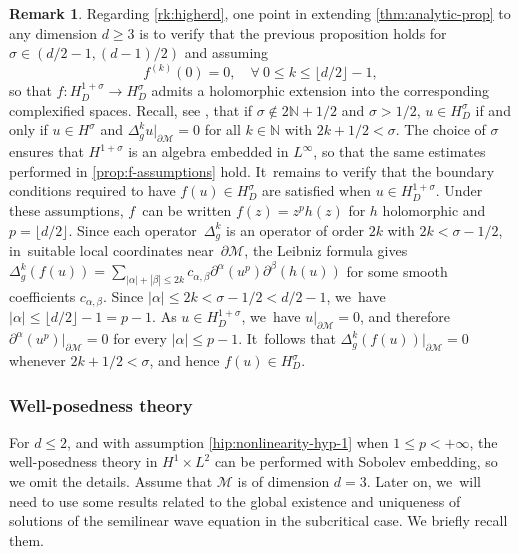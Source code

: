 \documentclass[10pt]{amsart}
\theoremstyle{definition}
\newtheorem{remark}[theorem]{Remark}
\let\mc\mathcal
\let\al\alpha
\newcommand{\M}{\mc{M}}
\newcommand{\N}{\mathbb{N}}
\begin{document}
\skpt
\begin{remark}\label{rk:proofhigherd}
Regarding \cref{rk:higherd}, one point in extending \cref{thm:analytic-prop} to any dimension $d\geq 3$ is to verify that the previous proposition holds for $\sigma\in (d/2-1, (d-1)/2)$ and assuming
\begin{equation*}
f^{(k)}(0)=0, \quad \forall~0\leq k\leq \lfloor d/2\rfloor-1,
\end{equation*}
so that $f: H^{1+\sigma}_D\to H^{\sigma}_D$ admits a holomorphic extension into the corresponding complexified spaces. Recall, see \cite{G:67}, that if $\sigma\notin 2\N+1/2$ and $\sigma>1/2$, $u\in H^{\sigma}_D$ if and only if $u\in H^{\sigma}$ and $\Delta_g^ku|_{\partial \M}=0$ for all $k\in \N$ with $2k+1/2< \sigma $. The choice of $\sigma$ ensures that $H^{1+\sigma}$ is an algebra embedded in $L^{\infty}$, so that the same estimates performed in \cref{prop:f-assumptions} hold. It~remains to verify that the boundary conditions required to have $f(u)\in H^{\sigma}_D$ are satisfied when $u\in H_D^{1+\sigma}$. Under these assumptions, $f$~can be written $f(z)=z^{p}h(z)$ for $h$ holomorphic and $p=\lfloor d/2\rfloor$. Since each operator~$\Delta_g^k$ is an operator of order $2k$ with $2k<\sigma-1/2$, in~suitable local coordinates near~$\partial\M$, the Leibniz formula gives $\Delta_g^k (f(u))=\sum_{|\alpha|+|\beta|\leq 2k} c_{\alpha,\beta}\partial^{\alpha}(u^{p})\partial^{\beta}(h(u))$ for some smooth coefficients $c_{\alpha,\beta}$. Since $|\alpha|\leq 2k<\sigma-1/2<d/2-1$, we~have $|\alpha|\leq \lfloor d/2\rfloor-1=p-1$. As $u\in H_D^{1+\sigma}$, we~have $u|_{\partial\M}=0$, and therefore $\partial^{\alpha}(u^{p})|_{\partial\M}=0$ for every $|\al|\leq p-1$. It~follows that $\Delta_g^k(f(u))|_{\partial\M}=0$ whenever $2k+1/2<\sigma$, and hence $f(u)\in H_D^\sigma$.
\end{remark}

\subsubsection{Well-posedness theory} For $d\leq 2$, and with assumption \eqref{hip:nonlinearity-hyp-1} when $1\leq p<+\infty$, the well-posedness theory in $H^1\times L^2$ can be performed with Sobolev embedding, so we omit the details. Assume that $\M$ is of dimension $d=3$. Later on, we~will need to use some results related to the global existence and uniqueness of solutions of the semilinear wave equation in the subcritical case. We briefly recall them.
\end{document}
